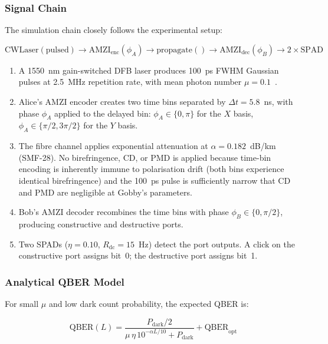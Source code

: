 \documentclass[3p,times,preprint]{elsarticle}
\begin{document}
\subsubsection{Signal Chain}

The simulation chain closely follows the experimental setup:

\begin{equation}
  \text{CWLaser}(\text{pulsed}) \to \text{AMZI}_{\text{enc}}(\phi_A)
  \to \text{propagate}() \to \text{AMZI}_{\text{dec}}(\phi_B)
  \to 2\times\text{SPAD}
\end{equation}

\begin{enumerate}[nosep]
  \item A 1550~nm gain-switched DFB laser produces 100~ps FWHM Gaussian
    pulses at 2.5~MHz repetition rate, with mean photon number
    $\mu = 0.1$~\cite{gobby}.
  \item Alice's AMZI encoder creates two time bins separated by
    $\Delta t = 5.8$~ns, with phase $\phi_A$ applied to the delayed
    bin: $\phi_A \in \{0,\pi\}$ for the $X$ basis,
    $\phi_A \in \{\pi/2,3\pi/2\}$ for the $Y$ basis.
  \item The fibre channel applies exponential attenuation at
    $\alpha = 0.182$~dB/km (SMF-28).  No birefringence, CD, or PMD
    is applied because time-bin encoding is inherently immune to
    polarisation drift (both bins experience identical birefringence)
    and the 100~ps pulse is sufficiently narrow that CD and PMD
    are negligible at Gobby's parameters.
  \item Bob's AMZI decoder recombines the time bins with phase
    $\phi_B \in \{0,\pi/2\}$, producing constructive and destructive
    ports.
  \item Two SPADs ($\eta = 0.10$, $R_{\text{dc}} = 15$~Hz) detect
    the port outputs.  A click on the constructive port assigns
    bit~0; the destructive port assigns bit~1.
\end{enumerate}

\subsubsection{Analytical QBER Model}

For small $\mu$ and low dark count probability, the expected QBER is:

\begin{equation}
  \text{QBER}(L) = \frac{P_{\text{dark}}/2}
    {\mu\,\eta\,10^{-\alpha L/10} + P_{\text{dark}}}
    + \text{QBER}_{\text{opt}}
\end{equation}
\end{document}
